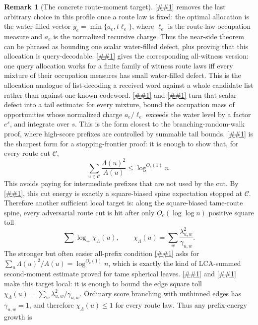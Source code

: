 \documentclass[10pt]{article}
\newcommand{\cref}[1]{\ref{##1}}
\newcommand{\Cref}[1]{\ref{##1}}
\theoremstyle{definition}
\newtheorem{remark}[theorem]{Remark}
\begin{document}
\begin{remark}[The concrete route-moment target]
   \Cref{lem:waterfilled-allocation} removes the last arbitrary choice in this
   profile once a route law is fixed: the optimal allocation is the
   water-filled vector \(y_e=\min\{a_e,t\ell_e\}\), where
   \(\ell_e\) is the route-law occupation measure and \(a_e\) is the normalized
   recursive charge.  Thus the near-side theorem can be phrased as bounding
   one scalar water-filled defect, plus proving that this allocation is
   query-decodable.
   \Cref{lem:robust-waterfilled-minimax} gives the corresponding all-witness
   version: one query allocation works for a finite family of witness route
   laws iff every mixture of their occupation measures has small water-filled
   defect.  This is the allocation analogue of list-decoding a received word
   against a whole candidate list rather than against one known codeword.
   \Cref{lem:waterfilled-layercake} and
   \cref{cor:robust-waterfilled-tail} turn that scalar defect into a tail
   estimate: for every mixture, bound the occupation mass of opportunities
   whose normalized charge \(a_e/\ell_e\) exceeds the water level by a factor
   \(e^s\), and integrate over \(s\).  This is the form closest to the
   branching-random-walk proof, where high-score prefixes are controlled by
   summable tail bounds.
   \Cref{lem:cut-energy-route-law} is the sharpest form for a stopping-frontier
   proof: it is enough to show that, for every route cut $\mathcal C$,
   \[
      \sum_{u\in\mathcal C}\frac{\Lambda(u)^2}{A(u)}
      \le \log^{O_c(1)}n .
   \]
   This avoids paying for intermediate prefixes that are not used by the cut.
   By \cref{lem:frontier-square-toll}, this cut energy is exactly a
   square-biased spine expectation stopped at $\mathcal C$.  Therefore another
   sufficient local target is: along the square-biased tame-route spine, every
   adversarial route cut is hit after only $O_c(\log\log n)$ positive square
   toll
   \[
      \sum\log_+\chi_\Lambda(u),
      \qquad
      \chi_\Lambda(u)=
      \sum_w\frac{\lambda_{u,w}^2}{\gamma_{u,w}} .
   \]
   The stronger but often easier all-prefix condition
   \cref{cor:route-law-prefix-energy} asks for
   $\sum_u\Lambda(u)^2/A(u)=\log^{O_c(1)}n$, which is exactly the kind of
   LCA-summed second-moment estimate proved for tame spherical leaves.
   \Cref{lem:local-prefix-energy} and
   \cref{lem:prefix-energy-spine-toll} make this target local: it is enough
   to bound the edge square toll
   $\chi_\Lambda(u)=\sum_w\lambda_{u,w}^2/\gamma_{u,w}$. Ordinary score
   branching with unthinned edges has $\gamma_{u,w}=1$, and therefore
   $\chi_\Lambda(u)\le1$ for every route law. Thus any prefix-energy growth is

\end{remark}
\end{document}
